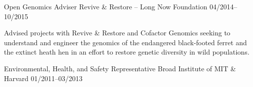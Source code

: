 \begin{cventries}
  \cventry
    {Open Genomics Adviser} %
    {Revive \& Restore -- Long Now Foundation} %
    {} %
    {04/2014--10/2015} %
    {
      \begin{cvitems} %
        \item {Advised projects with Revive \& Restore and Cofactor Genomics seeking to understand and engineer the genomics of the endangered black-footed ferret and the extinct heath hen in an effort to restore genetic diversity in wild populations.}
      \end{cvitems}
    }

  \cventry
    {Environmental, Health, and Safety Representative} %
    {Broad Institute of MIT \& Harvard} %
    {} %
    {01/2011--03/2013} %
    {}   
    
\end{cventries}
